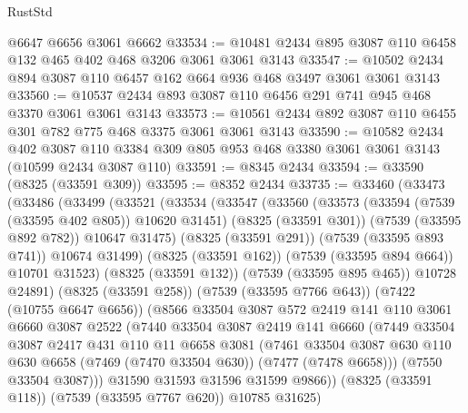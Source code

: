 \begin{lexlean}{RustStd}
\begin{coremodule}
    @6647
    @6656
    @3061
    @6662
@33534 := @10481 @2434 @895 @3087 @110 @6458 @132 @465 @402 @468 @3206 @3061 @3061 @3143
@33547 := @10502 @2434 @894 @3087 @110 @6457 @162 @664 @936 @468 @3497 @3061 @3061 @3143
@33560 := @10537 @2434 @893 @3087 @110 @6456 @291 @741 @945 @468 @3370 @3061 @3061 @3143
@33573 := @10561 @2434 @892 @3087 @110 @6455 @301 @782 @775 @468 @3375 @3061 @3061 @3143
@33590 := @10582
    @2434
    @402
    @3087
    @110
    @3384
    @309
    @805
    @953
    @468
    @3380
    @3061
    @3061
    @3143
    (@10599 @2434 @3087 @110)
@33591 := @8345 @2434
@33594 := @33590 (@8325 (@33591 @309))
@33595 := @8352 @2434
@33735 := @33460
    (@33473
      (@33486
        (@33499
          (@33521
            (@33534
              (@33547
                (@33560
                  (@33573
                    (@33594 (@7539 (@33595 @402 @805)) @10620 @31451)
                    (@8325 (@33591 @301))
                    (@7539 (@33595 @892 @782))
                    @10647
                    @31475)
                  (@8325 (@33591 @291))
                  (@7539 (@33595 @893 @741))
                  @10674
                  @31499)
                (@8325 (@33591 @162))
                (@7539 (@33595 @894 @664))
                @10701
                @31523)
              (@8325 (@33591 @132))
              (@7539 (@33595 @895 @465))
              @10728
              @24891)
            (@8325 (@33591 @258))
            (@7539 (@33595 @7766 @643))
            (@7422 (@10755 @6647 @6656))
            (@8566
              @33504
              @3087
              @572
              @2419
              @141
              @110
              @3061
              @6660
              @3087
              @2522
              (@7440
                @33504
                @3087
                @2419
                @141
                @6660
                (@7449
                  @33504
                  @3087
                  @2417
                  @431
                  @110
                  @11
                  @6658
                  @3081
                  (@7461
                    @33504
                    @3087
                    @630
                    @110
                    @630
                    @6658
                    (@7469 (@7470 @33504 @630))
                    (@7477 (@7478 @6658)))
                  (@7550 @33504 @3087)))
              @31590
              @31593
              @31596
              @31599
              @9866))
          (@8325 (@33591 @118))
          (@7539 (@33595 @7767 @620))
          @10785
          @31625)

\end{coremodule}
\end{lexlean}
